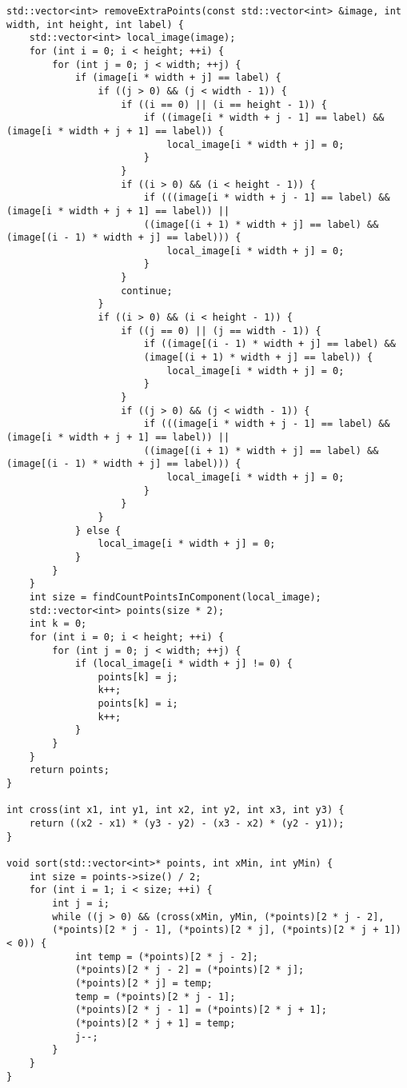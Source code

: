 \begin{verbatim}
std::vector<int> removeExtraPoints(const std::vector<int> &image, int width, int height, int label) {
	std::vector<int> local_image(image);
	for (int i = 0; i < height; ++i) {
		for (int j = 0; j < width; ++j) {
			if (image[i * width + j] == label) {
				if ((j > 0) && (j < width - 1)) {
					if ((i == 0) || (i == height - 1)) {
						if ((image[i * width + j - 1] == label) && (image[i * width + j + 1] == label)) {
							local_image[i * width + j] = 0;
						}
					}
					if ((i > 0) && (i < height - 1)) {
						if (((image[i * width + j - 1] == label) && (image[i * width + j + 1] == label)) ||
						((image[(i + 1) * width + j] == label) && (image[(i - 1) * width + j] == label))) {
							local_image[i * width + j] = 0;
						}
					}
					continue;
				}
				if ((i > 0) && (i < height - 1)) {
					if ((j == 0) || (j == width - 1)) {
						if ((image[(i - 1) * width + j] == label) &&
						(image[(i + 1) * width + j] == label)) {
							local_image[i * width + j] = 0;
						}
					}
					if ((j > 0) && (j < width - 1)) {
						if (((image[i * width + j - 1] == label) && (image[i * width + j + 1] == label)) ||
						((image[(i + 1) * width + j] == label) && (image[(i - 1) * width + j] == label))) {
							local_image[i * width + j] = 0;
						}
					}
				}
			} else {
				local_image[i * width + j] = 0;
			}
		}
	}
	int size = findCountPointsInComponent(local_image);
	std::vector<int> points(size * 2);
	int k = 0;
	for (int i = 0; i < height; ++i) {
		for (int j = 0; j < width; ++j) {
			if (local_image[i * width + j] != 0) {
				points[k] = j;
				k++;
				points[k] = i;
				k++;
			}
		}
	}
	return points;
}

int cross(int x1, int y1, int x2, int y2, int x3, int y3) {
	return ((x2 - x1) * (y3 - y2) - (x3 - x2) * (y2 - y1));
}

void sort(std::vector<int>* points, int xMin, int yMin) {
	int size = points->size() / 2;
	for (int i = 1; i < size; ++i) {
		int j = i;
		while ((j > 0) && (cross(xMin, yMin, (*points)[2 * j - 2],
		(*points)[2 * j - 1], (*points)[2 * j], (*points)[2 * j + 1]) < 0)) {
			int temp = (*points)[2 * j - 2];
			(*points)[2 * j - 2] = (*points)[2 * j];
			(*points)[2 * j] = temp;
			temp = (*points)[2 * j - 1];
			(*points)[2 * j - 1] = (*points)[2 * j + 1];
			(*points)[2 * j + 1] = temp;
			j--;
		}
	}
}


\end{verbatim}
